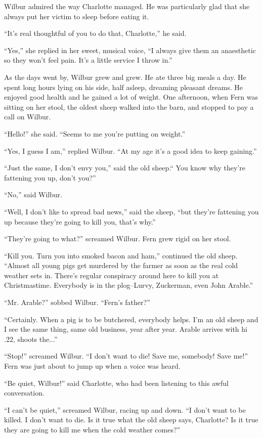 \documentclass[a4paper, oneside]{book}
\begin{document}
 Wilbur admired the way Charlotte managed. He was particularly
glad that she always put her victim to sleep before eating it.

 ``It's real thoughtful of you to do that, Charlotte,'' he said.

 ``Yes,'' she replied in her sweet, musical voice, ``I always give them
an anaesthetic so they won't feel pain. It's a little service I throw
in.''

 As the days went by, Wilbur grew and grew. He ate three big
meals a day. He spent long hours lying on his side, half asleep,
dreaming pleasant dreams. He enjoyed good health and he gained
a lot of weight. One afternoon, when Fern was sitting on her stool,
the oldest sheep walked into the barn, and stopped to pay a call on
Wilbur.

 ``Hello!'' she said. ``Seems to me you're putting on weight.''

 ``Yes, I guess I am,'' replied Wilbur. ``At my age it's a good idea to
keep gaining.''

 ``Just the same, I don't envy you,'' said the old sheep.`` You know
why they're fattening you up, don't you?''

 ``No,'' said Wilbur. 

 ``Well, I don't like to spread bad news,'' said the sheep, ``but
they're fattening you up because they're going to kill you, that's
why.''

 ``They're going to what?'' screamed Wilbur. Fern grew rigid on her
stool.

 ``Kill you. Turn you into smoked bacon and ham,'' continued the
old sheep. ``Almost all young pigs get murdered by the farmer as
soon as the real cold weather sets in. There's regular conspiracy
around here to kill you at Christmastime. Everybody is in the
plog--Lurvy, Zuckerman, even John Arable.'' 

  ``Mr. Arable?'' sobbed Wilbur. ``Fern's father?''

 ``Certainly. When a pig is to be butchered, everybody helps. I'm an
old sheep and I see the same thing, same old business, year after
year. Arable arrives with hi .22, shoots the...''

 ``Stop!'' screamed Wilbur. ``I don't want to die! Save me, somebody!
Save me!'' Fern was just about to jump up when a voice was heard.

 ``Be quiet, Wilbur!'' said Charlotte, who had been listening to this
awful conversation.

 ``I can't be quiet,'' screamed Wilbur, racing up and down. ``I don't
want to be killed. I don't want to die. Is it true what the old sheep
says, Charlotte? Is it true they are going to kill me when the cold
weather comes?'' 
\end{document}
